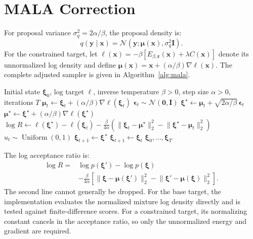 \section{MALA Correction}
\label{app:mala}

For proposal variance $\sigma_q^2=2\alpha/\beta$, the proposal density is:
\begin{equation}
q(\mathbf y\mid\mathbf x)
=\mathcal N(\mathbf y;\boldsymbol\mu(\mathbf x),
\sigma_q^2\mathbf I).
\end{equation}
For the constrained target, let
$\ell(\mathbf x)=-\beta[E_{\beta,\mathbf r}(\mathbf x)+\lambda C(\mathbf x)]$
denote its unnormalized log density and define
$\boldsymbol\mu(\mathbf x)=
\mathbf x+(\alpha/\beta)\nabla\ell(\mathbf x)$. The complete adjusted sampler
is given in Algorithm~\ref{alg:mala}.

\begin{algorithm}[ht]
\caption{MALA Stochastic Attention Sampler}
\label{alg:mala}
\begin{algorithmic}[1]
\REQUIRE Initial state $\boldsymbol\xi_0$, log target $\ell$, inverse
temperature $\beta>0$, step size $\alpha>0$, iterations $T$
\STATE $\boldsymbol\mu_t\leftarrow\boldsymbol\xi_t
+(\alpha/\beta)\nabla\ell(\boldsymbol\xi_t)$
\STATE $\boldsymbol\epsilon_t\sim\mathcal N(\mathbf0,\mathbf I)$
\STATE $\boldsymbol\xi^\star\leftarrow\boldsymbol\mu_t
+\sqrt{2\alpha/\beta}\,\boldsymbol\epsilon_t$
\STATE $\boldsymbol\mu^\star\leftarrow\boldsymbol\xi^\star
+(\alpha/\beta)\nabla\ell(\boldsymbol\xi^\star)$
\STATE $\log R\leftarrow\ell(\boldsymbol\xi^\star)-\ell(\boldsymbol\xi_t)
-\frac{\beta}{4\alpha}\left(
\lVert\boldsymbol\xi_t-\boldsymbol\mu^\star\rVert_2^2
-\lVert\boldsymbol\xi^\star-\boldsymbol\mu_t\rVert_2^2\right)$
\STATE $u_t\sim\operatorname{Uniform}(0,1)$
\STATE $\boldsymbol\xi_{t+1}\leftarrow\boldsymbol\xi^\star$
\ELSE
\STATE $\boldsymbol\xi_{t+1}\leftarrow\boldsymbol\xi_t$
\ENDIF
\ENDFOR
\RETURN $\boldsymbol\xi_0,\ldots,\boldsymbol\xi_T$
\end{algorithmic}
\end{algorithm}

The log acceptance ratio is:
\begin{align}
\log R
={}&\log p(\boldsymbol\xi')-\log p(\boldsymbol\xi)\\
&-\frac{\beta}{4\alpha}
\left[\lVert\boldsymbol\xi-\boldsymbol\mu(\boldsymbol\xi')\rVert_2^2
-\lVert\boldsymbol\xi'-\boldsymbol\mu(\boldsymbol\xi)\rVert_2^2\right].
\end{align}
The second line cannot generally be dropped. For the base target, the
implementation evaluates the normalized mixture log density directly and is
tested against finite-difference scores. For a constrained target, its
normalizing constant cancels in the acceptance ratio, so only the unnormalized
energy and gradient are required.

